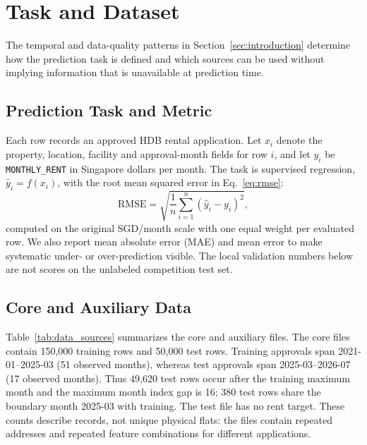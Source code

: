 \section{Task and Dataset}\label{sec:task}
The temporal and data-quality patterns in Section~\ref{sec:introduction} determine how the prediction task is defined and which sources can be used without implying information that is unavailable at prediction time.

\subsection{Prediction Task and Metric}
Each row records an approved HDB rental application.  Let $x_i$ denote the property, location, facility and approval-month fields for row $i$, and let $y_i$ be \texttt{MONTHLY\_RENT} in Singapore dollars per month.  The task is supervised regression, $\hat y_i=f(x_i)$, with the root mean squared error in Eq.~\ref{eq:rmse}:
\begin{equation}
\label{eq:rmse}
\mathrm{RMSE}=\sqrt{\frac{1}{n}\sum_{i=1}^{n}(\hat y_i-y_i)^2},
\end{equation}
computed on the original SGD/month scale with one equal weight per evaluated row.  We also report mean absolute error (MAE) and mean error to make systematic under- or over-prediction visible.  The local validation numbers below are not scores on the unlabeled competition test set.

\subsection{Core and Auxiliary Data}
Table~\ref{tab:data_sources} summarizes the core and auxiliary files.  The core files contain 150,000 training rows and 50,000 test rows.  Training approvals span 2021-01--2025-03 (51 observed months), whereas test approvals span 2025-03--2026-07 (17 observed months).  Thus 49,620 test rows occur after the training maximum month and the maximum month index gap is 16; 380 test rows share the boundary month 2025-03 with training.  The test file has no rent target.  These counts describe records, not unique physical flats: the files contain repeated addresses and repeated feature combinations for different applications.

